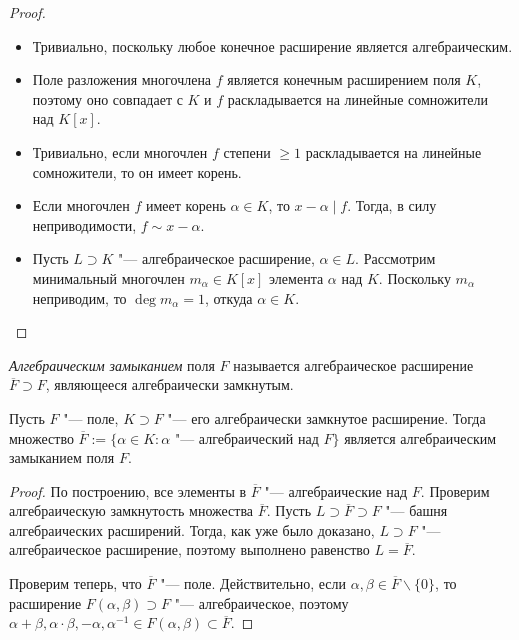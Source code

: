 \begin{proof}~
	\begin{itemize}
		\item{}Тривиально, поскольку любое конечное расширение является алгебраическим.
		\item{}Поле разложения многочлена $f$ является конечным расширением поля $K$, поэтому оно совпадает с $K$ и $f$ раскладывается на линейные сомножители над $K[x]$.
		\item{}Тривиально, если многочлен $f$ степени $\ge 1$ раскладывается на линейные сомножители, то он имеет корень.
		\item{}Если многочлен $f$ имеет корень $\alpha \in K$, то $x - \alpha \mid f$. Тогда, в силу неприводимости, $f \sim x - \alpha$.
		\item{}Пусть $L \supset K$ "--- алгебраическое расширение, $\alpha \in L$. Рассмотрим минимальный многочлен $m_\alpha \in K[x]$ элемента $\alpha$ над $K$. Поскольку $m_\alpha$ неприводим, то $\deg{m_\alpha} = 1$, откуда $\alpha \in K$.\qedhere
	\end{itemize}
\end{proof}

\begin{definition}
	\textit{Алгебраическим замыканием} поля $F$ называется алгебраическое расширение $\overline{F} \supset F$, являющееся алгебраически замкнутым.
\end{definition}

\begin{proposition}
	Пусть $F$ "--- поле, $K \supset F$ "--- его алгебраически замкнутое расширение. Тогда множество $\overline{F} := \{\alpha \in K: \alpha\text{ "--- алгебраический над }F\}$ является алгебраическим замыканием поля $F$.
\end{proposition}

\begin{proof}
	По построению, все элементы в $\overline{F}$ "--- алгебраические над $F$. Проверим алгебраическую замкнутость множества $\overline{F}$. Пусть $L \supset \overline{F} \supset F$ "--- башня алгебраических расширений. Тогда, как уже было доказано, $L \supset F$ "--- алгебраическое расширение, поэтому выполнено равенство $L = \overline{F}$.
	
	\pagebreak 
	Проверим теперь, что $\overline{F}$ "--- поле. Действительно, если $\alpha, \beta \in \overline{F} \backslash \{0\}$, то расширение $F(\alpha, \beta) \supset F$ "--- алгебраическое, поэтому $\alpha + \beta, \alpha \cdot \beta, -\alpha, \alpha^{-1} \in F(\alpha, \beta) \subset \overline{F}$.
\end{proof}

